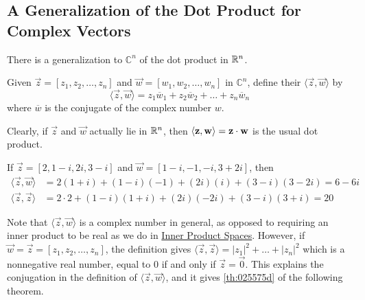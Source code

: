 \documentclass{ximera}
\begin{document}
\subsection*{A Generalization of the Dot Product for Complex Vectors}

There is a generalization to $\mathbb{C}^n$ of the dot product in $\mathbb{R}^n$.

\begin{definition}\label{def:025549}
Given $\vec{z} = [z_{1}, z_{2}, \ldots, z_{n}]$ and $\vec{w} = [w_{1}, w_{2}, \ldots, w_{n}]$ in $\mathbb{C}^n$, define their  $\langle \vec{z}, \vec{w} \rangle$ by
\begin{equation*}
\langle \vec{z}, \vec{w} \rangle = z_{1}\overline{w}_{1} + z_{2}\overline{w}_{2} + \ldots + z_{n}\overline{w}_{n}
\end{equation*}
where $\overline{w}$ is the conjugate of the complex number $w$.
\end{definition}

Clearly, if $\vec{z}$ and $\vec{w}$ actually lie in $\mathbb{R}^n$, then $\langle \mathbf{z}, \mathbf{w} \rangle = \mathbf{z} \cdot \mathbf{w}$ is the usual dot product.


\begin{example}\label{exa:025563}
If $\vec{z} = [2, 1 - i, 2i, 3 - i]$ and $\vec{w} = [1 - i, -1, -i, 3 + 2i]$, then
\begin{align*}
\langle \vec{z}, \vec{w} \rangle &= 2(1 + i) + (1 - i)(-1) + (2i)(i) + (3 - i)(3 - 2i) = 6 -6i \\
\langle \vec{z}, \vec{z} \rangle &= 2 \cdot 2 + (1 - i)(1 + i) + (2i)(-2i) + (3 - i)(3 + i) = 20
\end{align*}
\end{example}

Note that $\langle \vec{z}, \vec{w} \rangle$ is a complex number in general, as opposed to requiring an inner product to be real as we do in \href{https://ximera.osu.edu/oerlinalg/LinearAlgebra/VSP-0070/main}{Inner Product Spaces}. However, if $\vec{w} = \vec{z} = [z_{1}, z_{2}, \ldots, z_{n}]$, the definition gives $\langle \vec{z}, \vec{z} \rangle = |z_{1}|^{2} + \ldots  + |z_{n}|^{2}$ which is a nonnegative real number, equal to $0$ if and only if $\vec{z} = \vec{0}$. This explains the conjugation in the definition of $\langle \vec{z}, \vec{w} \rangle$, and it gives \ref{th:025575d} of the following theorem.
\end{document}
